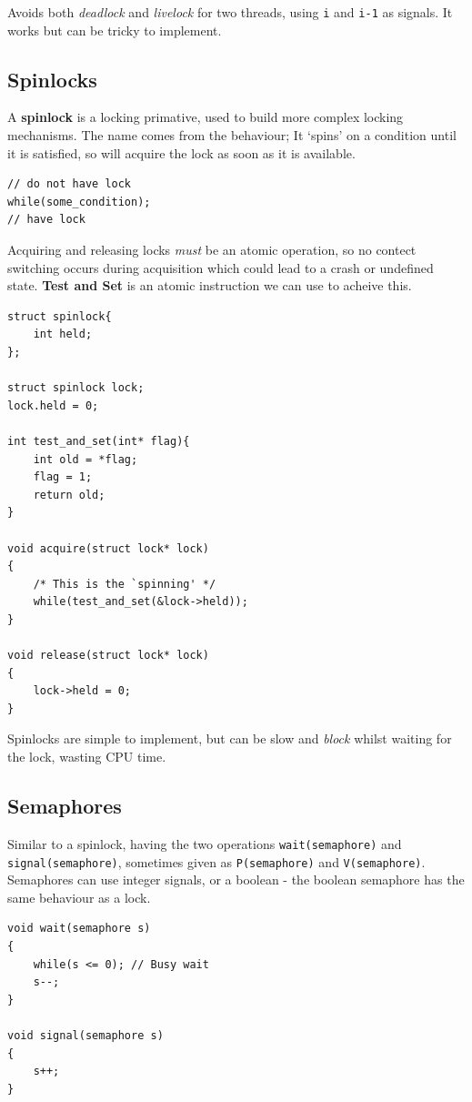 \documentclass[a4]{article}
\begin{document}
Avoids both \emph{deadlock} and \emph{livelock} for two threads, using
\texttt{i} and \texttt{i-1} as signals. It works but can be tricky to
implement.

\subsection{Spinlocks}\label{spinlocks}

A \textbf{spinlock} is a locking primative, used to build more complex
locking mechanisms. The name comes from the behaviour; It `spins' on a
condition until it is satisfied, so will acquire the lock as soon as it
is available.

\begin{verbatim}
// do not have lock
while(some_condition);
// have lock
\end{verbatim}

Acquiring and releasing locks \emph{must} be an atomic operation, so no
contect switching occurs during acquisition which could lead to a crash
or undefined state. \textbf{Test and Set} is an atomic instruction we
can use to acheive this.

\begin{verbatim}
struct spinlock{
    int held;
};

struct spinlock lock;
lock.held = 0;

int test_and_set(int* flag){
    int old = *flag;
    flag = 1;
    return old;
}

void acquire(struct lock* lock)
{
    /* This is the `spinning' */
    while(test_and_set(&lock->held));
}

void release(struct lock* lock)
{
    lock->held = 0;
}
\end{verbatim}

Spinlocks are simple to implement, but can be slow and \emph{block}
whilst waiting for the lock, wasting CPU time.

\subsection{Semaphores}\label{semaphores}

Similar to a spinlock, having the two operations
\texttt{wait(semaphore)} and \texttt{signal(semaphore)}, sometimes given
as \texttt{P(semaphore)} and \texttt{V(semaphore)}. Semaphores can use
integer signals, or a boolean - the boolean semaphore has the same
behaviour as a lock.

\begin{verbatim}
void wait(semaphore s)
{
    while(s <= 0); // Busy wait
    s--;
}

void signal(semaphore s)
{
    s++;
}
\end{verbatim}
\end{document}
